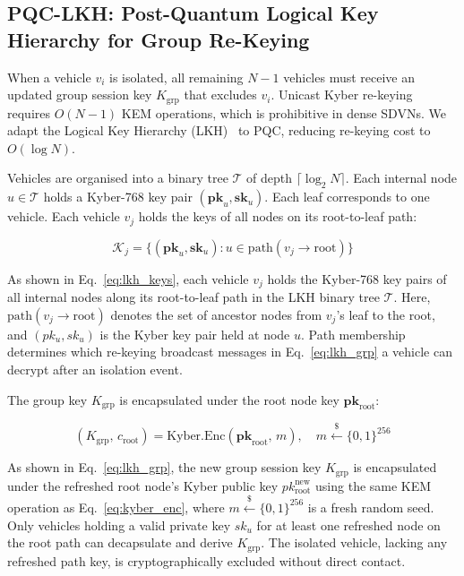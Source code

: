 \documentclass[12pt, a4paper]{report}
\begin{document}
\subsection{PQC-LKH: Post-Quantum Logical Key Hierarchy for Group Re-Keying}
\label{sec:pqc_lkh}

When a vehicle $v_i$ is isolated, all remaining $N-1$ vehicles must
receive an updated group session key $K_{\text{grp}}$ that excludes
$v_i$. Unicast Kyber re-keying requires $O(N-1)$ KEM operations,
which is prohibitive in dense SDVNs. We adapt the Logical Key
Hierarchy (LKH)~\cite{wallner1999lkh} to PQC, reducing re-keying
cost to $O(\log N)$.

Vehicles are organised into a binary tree $\mathcal{T}$ of depth
$\lceil \log_2 N \rceil$. Each internal node $u \in \mathcal{T}$
holds a Kyber-768 key pair $(\mathbf{pk}_u, \mathbf{sk}_u)$. Each
leaf corresponds to one vehicle. Each vehicle $v_j$ holds the keys
of all nodes on its root-to-leaf path:

\begin{equation}
\label{eq:lkh_keys}
\mathcal{K}_j = \bigl\{(\mathbf{pk}_u, \mathbf{sk}_u) :
u \in \mathrm{path}(v_j \to \mathrm{root})\bigr\}
\end{equation}

As shown in Eq.~\eqref{eq:lkh_keys}, each vehicle $v_j$ holds the Kyber-768 key pairs of all internal nodes along its root-to-leaf path in the LKH binary tree $\mathcal{T}$. Here, $\text{path}(v_j \rightarrow \text{root})$ denotes the set of ancestor nodes from $v_j$'s leaf to the root, and $(pk_u, sk_u)$ is the Kyber key pair held at node $u$. Path membership determines which re-keying broadcast messages in Eq.~\eqref{eq:lkh_grp} a vehicle can decrypt after an isolation event.

The group key $K_{\text{grp}}$ is encapsulated under the root node key
$\mathbf{pk}_{\mathrm{root}}$:

\begin{equation}
\label{eq:lkh_grp}
(K_{\text{grp}},\, c_{\mathrm{root}}) =
\mathrm{Kyber.Enc}(\mathbf{pk}_{\mathrm{root}},\, m),
\quad m \xleftarrow{\$} \{0,1\}^{256}
\end{equation}

As shown in Eq.~\eqref{eq:lkh_grp}, the new group session key $K_{\text{grp}}$ is encapsulated under the refreshed root node's Kyber public key $pk_{\text{root}}^{\text{new}}$ using the same KEM operation as Eq.~\eqref{eq:kyber_enc}, where $m \xleftarrow{\$} \{0,1\}^{256}$ is a fresh random seed. Only vehicles holding a valid private key $sk_u$ for at least one refreshed node on the root path can decapsulate and derive $K_{\text{grp}}$. The isolated vehicle, lacking any refreshed path key, is cryptographically excluded without direct contact.
\end{document}

